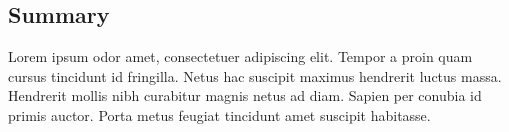 \documentclass[10pt,twocolumn,letterpaper]{article}
\begin{document}

\subsection{Summary}

Lorem ipsum odor amet, consectetuer adipiscing elit. Tempor a proin quam cursus
tincidunt id fringilla. Netus hac suscipit maximus hendrerit luctus massa.
Hendrerit mollis nibh curabitur magnis netus ad diam. Sapien per conubia id
primis auctor. Porta metus feugiat tincidunt amet suscipit habitasse.


    {\small
        
        
    }
\end{document}
